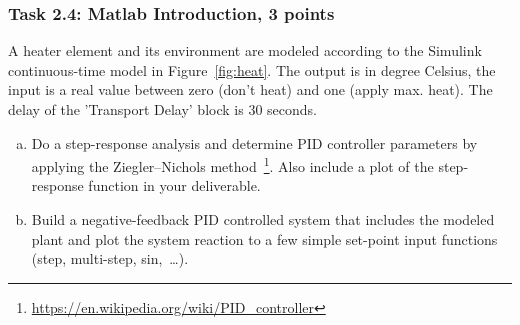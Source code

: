 \documentclass[12pt,a4paper,oneside]{article}
\begin{document}

%
%
\subsubsection*{Task 2.4: Matlab Introduction, 3 points}
A heater element and its environment are modeled according to the Simulink
continuous-time model in Figure~\ref{fig:heat}. The output is in degree
Celsius, the input is a real value between zero (don't heat) and one (apply
max. heat). The delay of the 'Transport Delay' block is 30 seconds.

\begin{enumerate}[a)]
\item Do a step-response analysis and determine PID controller parameters by
  applying the Ziegler–Nichols
  method~\footnote{\url{https://en.wikipedia.org/wiki/PID_controller}}.  Also
  include a plot of the step-response function in your deliverable.
\item Build a negative-feedback PID controlled system that includes the modeled
  plant and plot the system reaction to a few simple set-point input functions
  (step, multi-step, sin,~\ldots).
\end{enumerate}
\end{document}

